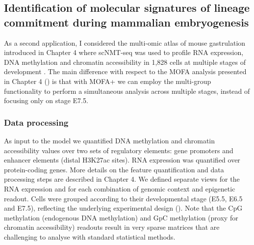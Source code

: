 
\subsection{Identification of molecular signatures of lineage commitment during mammalian embryogenesis}

As a second application, I considered the multi-omic atlas of mouse gastrulation introduced in Chapter 4 where scNMT-seq was used to profile RNA expression, DNA methylation and chromatin accessibility in 1,828 cells at multiple stages of development \cite{Argelaguet2019}. The main difference with respect to the MOFA analysis presented in Chapter 4 () is that with MOFA+ we can employ the multi-group functionality to perform a simultaneous analysis across multiple stages, instead of focusing only on stage E7.5.

\subsubsection{Data processing}

As input to the model we quantified DNA methylation and chromatin accessibility values over two sets of regulatory elements: gene promoters and enhancer elements (distal H3K27ac sites). RNA expression was quantified over protein-coding genes. More details on the feature quantification and data processing steps are described in Chapter 4. We defined separate views for the RNA expression and for each combination of genomic context and epigenetic readout. Cells were grouped according to their developmental stage (E5.5, E6.5 and E7.5), reflecting the underlying experimental design \cite{Argelaguet2019} (). Note that the CpG methylation (endogenous DNA methylation) and GpC methylation (proxy for chromatin accessibility) readouts result in very sparse matrices that are challenging to analyse with standard statistical methods.

